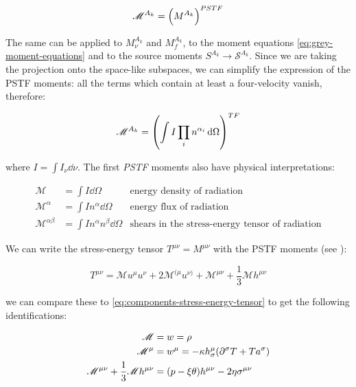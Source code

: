 \documentclass[main.tex]{subfiles}
\begin{document}
\begin{equation}
  \mathscr M ^{A_k} = \qty(M^{A_k}) ^{PSTF}
\end{equation}

The same can be applied to \(M^{A_k}_\nu\) and \(M^{A_k}_f\), to the moment equations \eqref{eq:grey-moment-equations} and to the source moments \(S^{A_k} \rightarrow \mathscr S ^{A_k}\). Since we are taking the projection onto the space-like subspaces, we can simplify the expression of the PSTF moments: all the terms which contain at least a four-velocity vanish, therefore:

\begin{equation} \label{eq:trace-free-moments-definition}
  \mathscr M^{A_k} = \qty(\int I \prod_i n^{\alpha_i} \dd{\Omega})^{TF}
\end{equation}

where \(I = \int I_\nu \dd{\nu}\).
The first \emph{PSTF} moments also have physical interpretations:

\begin{subequations}
\begin{align}
   \mathscr M &= \int  I \dd{\Omega}    & \text{energy density of radiation}  \\
   \mathscr M^\alpha &= \int I n^\alpha\dd{\Omega}  & \text{energy flux of radiation}  \\
   \mathscr M^{\alpha\beta} &= \int I n^\alpha n^\beta \dd{\Omega}   & \text{shears in the stress-energy tensor of radiation}
\end{align}
\end{subequations}

We can write the stress-energy tensor \(T^{\mu\nu} = M^{\mu\nu}\) with the PSTF moments (see \cite[eq. 4.9]{Thorne:1981feb}):

\begin{equation} \label{eq:PSTF-stress-energy-tensor-decomposition}
    T^{\mu\nu} = \mathscr M u^\mu u^\nu + 2 \mathscr M ^{(\mu} u^{\nu)}
    + \mathscr M ^{\mu\nu} + \frac{1}{3} \mathscr M h^{\mu\nu}
\end{equation}

we can compare these to \eqref{eq:components-stress-energy-tensor} to get the following identifications:

\begin{subequations}
\begin{align}
  \mathscr M &= w = \rho  \label{eq:identification-PSTF-stress-energy-tensor-1}\\
  \mathscr M ^\mu &= w^\mu = -\kappa h^\mu _\sigma  \qty(\partial^\sigma T + T a^\sigma) \label{eq:identification-PSTF-stress-energy-tensor-2}\\
  \mathscr M^{\mu\nu} + \frac{1}{3} \mathscr M h^{\mu\nu}
  &= (p - \xi \theta)h^{\mu\nu} - 2 \eta \sigma^{\mu\nu} \label{eq:identification-PSTF-stress-energy-tensor-3}
\end{align}
\end{subequations}
\end{document}
